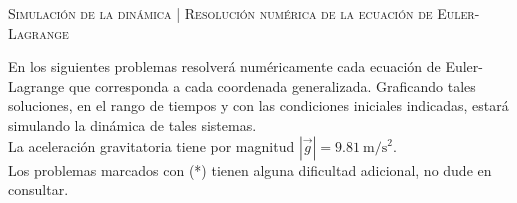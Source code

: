 \documentclass[11pt, spanish, a4paper, twoside]{article}
\begin{document}
\begin{center}
  \textsc{\large Simulación de la dinámica | Resolución numérica de la ecuación de Euler-Lagrange}
\end{center}

\noindent
En los siguientes problemas resolverá numéricamente cada ecuación de Euler-Lagrange que corresponda a cada coordenada generalizada.
Graficando tales soluciones, en el rango de tiempos y con las condiciones iniciales indicadas, estará simulando la dinámica de tales sistemas.\\
La aceleración gravitatoria tiene por magnitud \(|\vec{g}| = \SI{9.81}{\metre\per\second\squared}\).\\
Los problemas marcados con (*) tienen alguna dificultad adicional, no dude en consultar.
\end{document}
